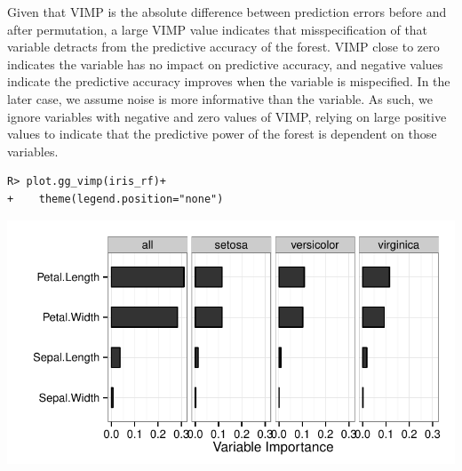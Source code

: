\documentclass[nojss,letterpaper]{jss}\usepackage[]{graphicx}\usepackage[]{color}
\makeatletter
\def\maxwidth{ %
  \ifdim\Gin@nat@width>\linewidth
    \linewidth
  \else
    \Gin@nat@width
  \fi
}
\newenvironment{kframe}{%
 \def\at@end@of@kframe{}%
 \ifinner\ifhmode%
  \def\at@end@of@kframe{\end{minipage}}%
  \begin{minipage}{\columnwidth}%
 \fi\fi%
 \def\FrameCommand##1{\hskip\@totalleftmargin \hskip-\fboxsep
 \colorbox{shadecolor}{##1}\hskip-\fboxsep
     \hskip-\linewidth \hskip-\@totalleftmargin \hskip\columnwidth}%
 \MakeFramed {\advance\hsize-\width
   \@totalleftmargin\z@ \linewidth\hsize
   \@setminipage}}%
 {\par\unskip\endMakeFramed%
 \at@end@of@kframe}
\newenvironment{knitrout}{}{} %
\makeatother
\begin{document}
Given that VIMP is the absolute difference between prediction errors before and after permutation, a large VIMP value indicates that misspecification of that variable detracts from the predictive accuracy of the forest. VIMP close to zero indicates the variable has no impact on predictive accuracy, and negative values indicate the predictive accuracy improves when the variable is mispecified. In the later case, we assume noise is more informative than the variable. As such, we ignore variables with negative and zero values of VIMP, relying on large positive values to indicate that the predictive power of the forest is dependent on those variables. 
\begin{knitrout}\footnotesize
{}\color{fgcolor}\begin{kframe}
\begin{verbatim}
R> plot.gg_vimp(iris_rf)+
+    theme(legend.position="none")
\end{verbatim}
\end{kframe}

{\centering \includegraphics[width=\maxwidth]{figure/vig-iris-vimp-1} 

}



\end{knitrout}
\end{document}
